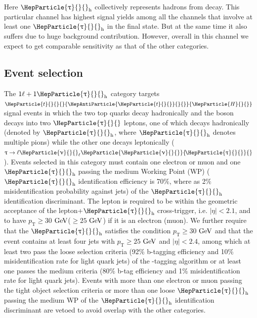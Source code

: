 \documentclass[12pt, a4paper]{article}
\newcommand{\pt}{\ensuremath{p_{\mathrm{T}}}\xspace}
\newcommand{\GeV}{\ensuremath{\text{Ge\hspace{-.08em}V}}{}\xspace}
\DeclareRobustCommand{\PH}{{\HepParticle{H}{}{}}\xspace}
\DeclareRobustCommand{\PQb}{{\HepParticle{b}{}{}}\xspace} %
\DeclareRobustCommand{\PQt}{\HepParticle{t}{}{}} %
\DeclareRobustCommand{\PAQt}{{\HepAntiParticle{\PQt}{}{}}\xspace} %
\DeclareRobustCommand{\PGt}{{\HepParticle{\uptau}{}{}}\xspace} %
\DeclareRobustCommand{\PGn}{{\HepParticle{\upnu}{}{}}\xspace} %
\DeclareRobustCommand{\PGnGt}{{\HepParticle{\PGn}{\!\PGt}{}}\xspace} %
\newcommand{\ttbar}{\PQt{}\PAQt} %
\newcommand{\tauh}{\ensuremath{\PGt_\mathrm{h}}\xspace}
\newcommand{\ttH}{\ttbar\PH}
\begin{document}
Here \tauh collectively represents hadrons from \PGt decay. This particular channel has highest signal yields among all the channels that involve at least one \tauh in the final state. But at the same time it also suffers due to huge background contribution. However, overall in this channel we expect to get comparable sensitivity as that of the other categories.  


\subsection{Event selection}
The $1\ell + 1\tauh$ category targets $\ttH$ signal events in which the two top quarks decay hadronically and the \PH boson decays into two $\PGt$ leptons, one of which decays hadronically (denoted by \tauh, where \tauh denotes multiple pions) while the other one decays leptonically ($\uptau\to\ell\PGn_{\ell}\PGnGt$). Events selected in this category must contain one electron or muon and one $\tauh$ passing the medium Working Point (WP) (\tauh identification efficiency is 70\%, where as 2\% misidentification probability against jets) of the $\tauh$ identification discriminant. The lepton is required to be within the geometric acceptance of the lepton+\tauh cross-trigger, i.e. $|\eta| < 2.1$, and to have $\pt \geq 30$ \GeV ($ \geq 25$ \GeV) if it is an electron (muon). We further require that the $\tauh$ satisfies the condition $\pt \geq 30$ \GeV and that the event contains at least four jets with $\pt \geq 25$ \GeV and $|\eta| < 2.4$, among which at least two pass the loose selection criteria (92\% b-tagging efficiency and 10\% misidentification rate for light quark jets) of the \PQb-tagging algorithm or at least one passes the medium criteria (80\% b-tag efficiency and 1\% misidentification rate for light quark jets). Events with more than one electron or muon passing the tight object selection criteria or more than one loose \tauh passing the medium WP of the \tauh identification discriminant are vetoed to avoid overlap with the other categories.
\end{document}
